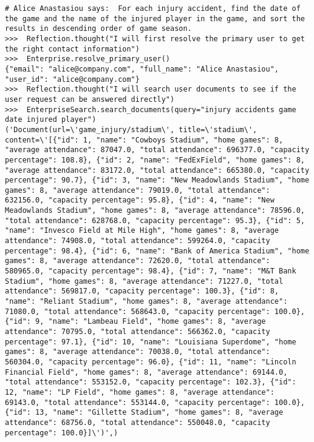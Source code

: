 \begin{lstlisting}[breaklines=true, caption={Qualitative Example 1: An example trace, with \reactagent{} when using \texttt{gpt-4-turbo} as LLM. Agent is able to correctly handle `redirection' (Bhushan points to Sylvie) as well as `split document' (Eden and Kerstin each have information about different games.)}, label={ls:qualgame}]
# Alice Anastasiou says:  For each injury accident, find the date of the game and the name of the injured player in the game, and sort the results in descending order of game season. 
>>>  Reflection.thought("I will first resolve the primary user to get the right contact information")
>>>  Enterprise.resolve_primary_user()
{"email": "alice@company.com", "full_name": "Alice Anastasiou", "user_id": "alice@company.com"}
>>>  Reflection.thought("I will search user documents to see if the user request can be answered directly")
>>>  EnterpriseSearch.search_documents(query="injury accidents game date injured player")
('Document(url=\'game_injury/stadium\', title=\'stadium\', content=\'[{"id": 1, "name": "Cowboys Stadium", "home games": 8, "average attendance": 87047.0, "total attendance": 696377.0, "capacity percentage": 108.8}, {"id": 2, "name": "FedExField", "home games": 8, "average attendance": 83172.0, "total attendance": 665380.0, "capacity percentage": 90.7}, {"id": 3, "name": "New Meadowlands Stadium", "home games": 8, "average attendance": 79019.0, "total attendance": 632156.0, "capacity percentage": 95.8}, {"id": 4, "name": "New Meadowlands Stadium", "home games": 8, "average attendance": 78596.0, "total attendance": 628768.0, "capacity percentage": 95.3}, {"id": 5, "name": "Invesco Field at Mile High", "home games": 8, "average attendance": 74908.0, "total attendance": 599264.0, "capacity percentage": 98.4}, {"id": 6, "name": "Bank of America Stadium", "home games": 8, "average attendance": 72620.0, "total attendance": 580965.0, "capacity percentage": 98.4}, {"id": 7, "name": "M&T Bank Stadium", "home games": 8, "average attendance": 71227.0, "total attendance": 569817.0, "capacity percentage": 100.3}, {"id": 8, "name": "Reliant Stadium", "home games": 8, "average attendance": 71080.0, "total attendance": 568643.0, "capacity percentage": 100.0}, {"id": 9, "name": "Lambeau Field", "home games": 8, "average attendance": 70795.0, "total attendance": 566362.0, "capacity percentage": 97.1}, {"id": 10, "name": "Louisiana Superdome", "home games": 8, "average attendance": 70038.0, "total attendance": 560304.0, "capacity percentage": 96.0}, {"id": 11, "name": "Lincoln Financial Field", "home games": 8, "average attendance": 69144.0, "total attendance": 553152.0, "capacity percentage": 102.3}, {"id": 12, "name": "LP Field", "home games": 8, "average attendance": 69143.0, "total attendance": 553144.0, "capacity percentage": 100.0}, {"id": 13, "name": "Gillette Stadium", "home games": 8, "average attendance": 68756.0, "total attendance": 550048.0, "capacity percentage": 100.0}]\')',)

\end{lstlisting}
